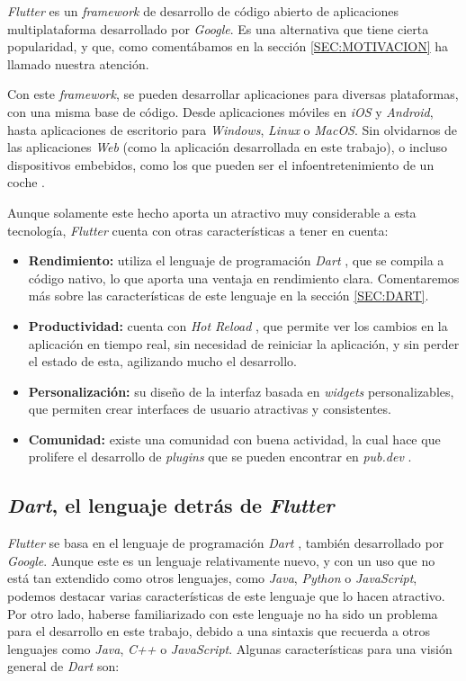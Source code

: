 \textit{Flutter} \cite{flutter} es un \textit{framework} de desarrollo de código abierto de aplicaciones multiplataforma desarrollado 
por \textit{Google}. Es una alternativa que tiene cierta popularidad, y que, como comentábamos en la sección \ref{SEC:MOTIVACION}
ha llamado nuestra atención.

Con este \textit{framework}, se pueden desarrollar aplicaciones para diversas plataformas, con una misma base de código.
Desde aplicaciones móviles en \textit{iOS} y \textit{Android}, hasta aplicaciones de escritorio para \textit{Windows}, \textit{Linux} o \textit{MacOS}. Sin olvidarnos de
las aplicaciones \textit{Web} (como la aplicación desarrollada en este trabajo), o incluso dispositivos 
embebidos, como los que pueden ser el infoentretenimiento de un coche \cite{flutter_car}. 

Aunque solamente este hecho aporta un atractivo muy considerable a esta tecnología, \textit{Flutter} cuenta con otras características a tener en cuenta:

\begin{itemize}
  \item \textbf{Rendimiento:} utiliza el lenguaje de programación \textit{Dart} \cite{dart}, que se compila a código nativo, lo que aporta una ventaja en rendimiento clara.
   Comentaremos más sobre las características de este lenguaje en la sección \ref{SEC:DART}.
  \item \textbf{Productividad:} cuenta con \textit{Hot Reload} \cite{hot_reload}, que permite ver los cambios en la aplicación en tiempo real, sin necesidad de reiniciar 
  la aplicación, y sin perder el estado de esta, agilizando mucho el desarrollo.
  \item \textbf{Personalización:} su diseño de la interfaz basada en \textit{widgets} personalizables, que permiten crear interfaces de usuario atractivas y consistentes.
  \item \textbf{Comunidad:} existe una comunidad con buena actividad, la cual hace que prolifere el desarrollo de \textit{plugins} que se pueden encontrar en \textit{pub.dev} \cite{pub_dev}.
\end{itemize}


\subsection{\textit{Dart}, el lenguaje detrás de \textit{Flutter}\label{SEC:DART}}

\textit{Flutter} se basa en el lenguaje de programación \textit{Dart} \cite{dart}, 
también desarrollado por \textit{Google}. Aunque este es un lenguaje relativamente nuevo, y con 
un uso que no está tan extendido como otros lenguajes, como \textit{Java}, \textit{Python} o \textit{JavaScript},
podemos destacar varias características de este lenguaje que lo hacen atractivo. Por otro lado, haberse familiarizado
con este lenguaje no ha sido un problema para el desarrollo en este trabajo, debido a una sintaxis que 
recuerda a otros lenguajes como \textit{Java}, \textit{C++} o \textit{JavaScript}. Algunas características 
para una visión general de \textit{Dart} \cite{dart_overview} son:

